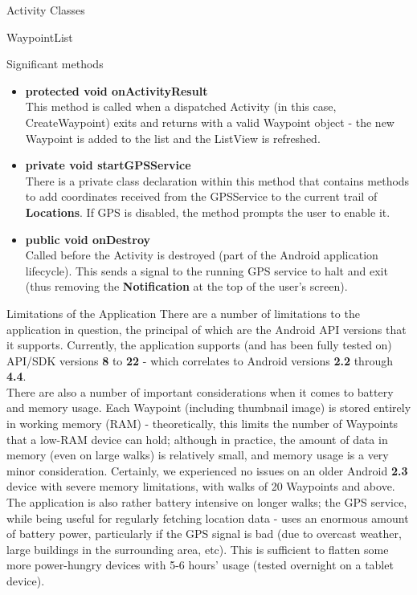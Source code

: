 \documentclass{article}
\begin{document}
\begin{section}{Activity Classes}
\begin{subsection}{WaypointList}
			
			\begin{subsubsection}{Significant methods}
				\begin{itemize}
					\item{{\bf protected void onActivityResult} \\
					This method is called when a dispatched Activity (in this case, CreateWaypoint) exits and returns with a valid Waypoint object - the new Waypoint is added to the list and the ListView is refreshed.}
					
					\item{{\bf private void startGPSService} \\
					There is a private class declaration within this method that contains methods to add coordinates received from the GPSService to the current trail of {\bf Locations}. If GPS is disabled, the method prompts the user to enable it.}
					
					\item{{\bf public void onDestroy} \\
					Called before the Activity is destroyed (part of the Android application lifecycle). This sends a signal to the running GPS service to halt and exit (thus removing the {\bf Notification} at the top of the user's screen).}
				\end{itemize}
			\end{subsubsection}
		\end{subsection}
	\end{section}
	
	\begin{section}{Limitations of the Application}
		There are a number of limitations to the application in question, the principal of which are the Android API versions that it supports. Currently, the application supports (and has been fully tested on) API/SDK versions {\bf 8} to {\bf 22} - which correlates to Android versions {\bf 2.2} through {\bf 4.4}. \\
		
		There are also a number of important considerations when it comes to battery and memory usage. Each Waypoint (including thumbnail image) is stored entirely in working memory (RAM) - theoretically, this limits the number of Waypoints that a low-RAM device can hold; although in practice, the amount of data in memory (even on large walks) is relatively small, and memory usage is a very minor consideration. Certainly, we experienced no issues on an older Android {\bf 2.3} device with severe memory limitations, with walks of 20 Waypoints and above. \\
		
		The application is also rather battery intensive on longer walks; the GPS service, while being useful for regularly fetching location data - uses an enormous amount of battery power, particularly if the GPS signal is bad (due to overcast weather, large buildings in the surrounding area, etc). This is sufficient to flatten some more power-hungry devices with 5-6 hours' usage (tested overnight on a tablet device).
	\end{section}
	
\end{document}
